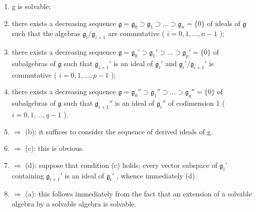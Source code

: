 \begin{enumerate}
\def\labelenumi{(\alph{enumi})}
\item
  g is solvable;
\item
  there exists a decreasing sequence \(\mathfrak{g} = \mathfrak{g}_0 \supset \mathfrak{g}_1 \supset \dots \supset \mathfrak{g}_n = \{0\}\) of ideals of \(\mathfrak{g}\) such that the algebras \(\mathfrak{g}_i / \mathfrak{g}_{i+1}\) are commutative ( \(i = 0, 1, \ldots, n-1\) );
\item
  there exists a decreasing sequence \(\mathfrak{g} = \mathfrak{g}_0' \supset \mathfrak{g}_1' \supset \dots \supset \mathfrak{g}_p' = \{0\}\) of subalgebras of \(\mathfrak{g}\) such that \(\mathfrak{g}_{i+1}'\) is an ideal of \(\mathfrak{g}_i'\) and \(\mathfrak{g}_i'/\mathfrak{g}_{i+1}'\) is commutative ( \(i = 0, 1, \ldots, p - 1\) );
\item
  there exists a decreasing sequence \(\mathfrak{g} = \mathfrak{g}_0'' \supset \mathfrak{g}_1'' \supset \dots \supset \mathfrak{g}_q'' = \{0\}\) of subalgebras of \(\mathfrak{g}\) such that \(\mathfrak{g}_{i+1}''\) is an ideal of \(\mathfrak{g}_i''\) of codimension 1 ( \(i = 0, 1, \ldots, q - 1\) ).
\item
  \(\Rightarrow\) (b): it suffices to consider the sequence of derived ideals of g.
\item
  \(\Rightarrow\) (c): this is obvious.
\item
  \(\Rightarrow\) (d): suppose that condition (c) holds; every vector subspace of \(\mathfrak{g}_i'\) containing \(\mathfrak{g}_{i+1}'\) is an ideal of \(\mathfrak{g}_i'\) , whence immediately (d).
\item
  \(\Rightarrow\) (a): this follows immediately from the fact that an extension of a solvable algebra by a solvable algebra is solvable.
\end{enumerate}

